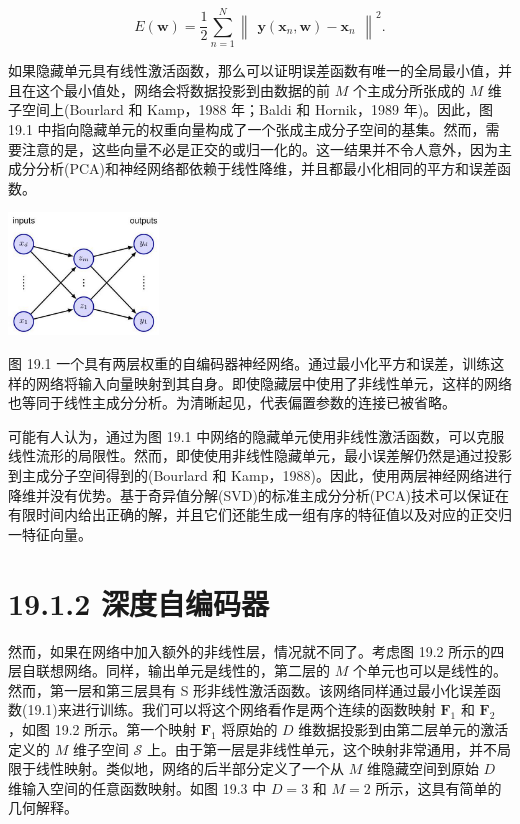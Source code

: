 \documentclass[10pt]{article}
\begin{document}
\[
E\left( \mathbf{w}\right)  = \frac{1}{2}\mathop{\sum }\limits_{{n = 1}}^{N}{\begin{Vmatrix}\mathbf{y}\left( {\mathbf{x}}_{n},\mathbf{w}\right)  - {\mathbf{x}}_{n}\end{Vmatrix}}^{2}. \tag{19.1}
\]

如果隐藏单元具有线性激活函数，那么可以证明误差函数有唯一的全局最小值，并且在这个最小值处，网络会将数据投影到由数据的前 \(M\) 个主成分所张成的 \(M\) 维子空间上(Bourlard 和 Kamp，1988 年；Baldi 和 Hornik，1989 年)。因此，图 19.1 中指向隐藏单元的权重向量构成了一个张成主成分子空间的基集。然而，需要注意的是，这些向量不必是正交的或归一化的。这一结果并不令人意外，因为主成分分析(PCA)和神经网络都依赖于线性降维，并且都最小化相同的平方和误差函数。

\begin{center}
\includegraphics[max width=0.3\textwidth]{images/0194e279-9b28-703a-88f4-c3ac21e2010d_584_1053_351_486_396_0.jpg}
\end{center}
\hspace*{3em} 

图 19.1 一个具有两层权重的自编码器神经网络。通过最小化平方和误差，训练这样的网络将输入向量映射到其自身。即使隐藏层中使用了非线性单元，这样的网络也等同于线性主成分分析。为清晰起见，代表偏置参数的连接已被省略。

可能有人认为，通过为图 19.1 中网络的隐藏单元使用非线性激活函数，可以克服线性流形的局限性。然而，即使使用非线性隐藏单元，最小误差解仍然是通过投影到主成分子空间得到的(Bourlard 和 Kamp，1988)。因此，使用两层神经网络进行降维并没有优势。基于奇异值分解(SVD)的标准主成分分析(PCA)技术可以保证在有限时间内给出正确的解，并且它们还能生成一组有序的特征值以及对应的正交归一特征向量。

\section*{19.1.2 深度自编码器}

然而，如果在网络中加入额外的非线性层，情况就不同了。考虑图 19.2 所示的四层自联想网络。同样，输出单元是线性的，第二层的 \(M\) 个单元也可以是线性的。然而，第一层和第三层具有 S 形非线性激活函数。该网络同样通过最小化误差函数(19.1)来进行训练。我们可以将这个网络看作是两个连续的函数映射 \({\mathbf{F}}_{1}\) 和 \({\mathbf{F}}_{2}\) ，如图 19.2 所示。第一个映射 \({\mathbf{F}}_{1}\) 将原始的 \(D\) 维数据投影到由第二层单元的激活定义的 \(M\) 维子空间 \(\mathcal{S}\) 上。由于第一层是非线性单元，这个映射非常通用，并不局限于线性映射。类似地，网络的后半部分定义了一个从 \(M\) 维隐藏空间到原始 \(D\) 维输入空间的任意函数映射。如图 19.3 中 \(D = 3\) 和 \(M = 2\) 所示，这具有简单的几何解释。
\end{document}
